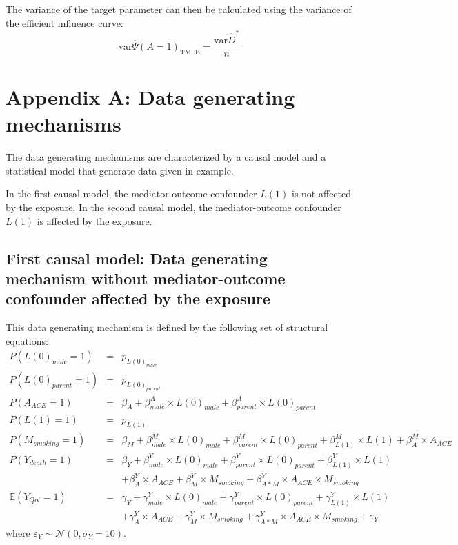 \documentclass[
]{book}
\begin{document}
The variance of the target parameter can then be calculated using the variance of the efficient influence curve:
\begin{equation*}
\text{var} \hat{\Psi}(A=1)_\text{TMLE} = \frac{\text{var} \hat{D}^*}{n}
\end{equation*}

\hypertarget{appendix_a}{%
\chapter{Appendix A: Data generating mechanisms}\label{appendix_a}}

The data generating mechanisms are characterized by a causal model and a statistical model that generate data given in example.

In the first causal model, the mediator-outcome confounder \(L(1)\) is not affected by the exposure. In the second causal model, the mediator-outcome confounder \(L(1)\) is affected by the exposure.

\hypertarget{first-causal-model-data-generating-mechanism-without-mediator-outcome-confounder-affected-by-the-exposure}{%
\section{First causal model: Data generating mechanism without mediator-outcome confounder affected by the exposure}\label{first-causal-model-data-generating-mechanism-without-mediator-outcome-confounder-affected-by-the-exposure}}

This data generating mechanism is defined by the following set of structural equations:
\[\begin{array}{lll}
P(L(0)_{male} = 1) &=& p_{L(0)_{male}}\\
P(L(0)_{parent} = 1) &=& p_{L(0)_{parent}}\\
P(A_{ACE} = 1) &=& \beta_{A} + \beta_{male}^A \times L(0)_{male} + \beta_{parent}^A \times L(0)_{parent}\\
P(L(1) = 1) &=& p_{L(1)}\\
P(M_{smoking} = 1) &=& \beta_{M} + \beta_{male}^M \times L(0)_{male} + \beta_{parent}^M \times L(0)_{parent} + \beta_{L(1)}^M \times L(1) + \beta_{A}^M \times A_{ACE}\\
P(Y_{death} = 1) &=& \beta_{Y} + \beta_{male}^Y \times L(0)_{male} + \beta_{parent}^Y \times L(0)_{parent} + \beta_{L(1)}^Y \times L(1)\\
                 & & + \beta_{A}^Y \times A_{ACE} + \beta_{M}^Y \times M_{smoking} + \beta_{A \ast M }^Y \times A_{ACE} \times M_{smoking}\\
\mathbb{E}(Y_{Qol} = 1) &=& \gamma_{Y} + \gamma_{male}^Y \times L(0)_{male} + \gamma_{parent}^Y \times L(0)_{parent} + \gamma_{L(1)}^Y \times L(1)\\
                        & &+ \gamma_{A}^Y \times A_{ACE} + \gamma_{M}^Y \times M_{smoking} + \gamma_{A \ast M }^Y \times A_{ACE} \times M_{smoking} + \varepsilon_Y
\end{array}\]
where \(\varepsilon_Y \sim \mathcal{N}(0,\sigma_Y = 10)\).
\end{document}
